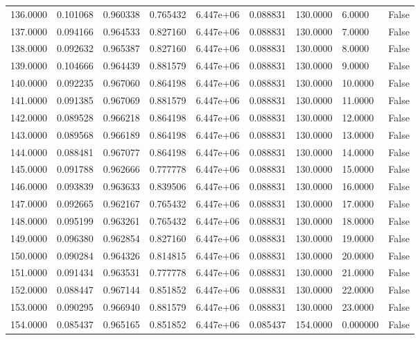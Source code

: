 \documentclass[11pt]{report}
\begin{document}
\begin{longtable}{lllllllll}
136.0000 & 0.101068 & 0.960338 & 0.765432 & 6.447e+06 & 0.088831 & 130.0000 & 6.0000 & False \\
137.0000 & 0.094166 & 0.964533 & 0.827160 & 6.447e+06 & 0.088831 & 130.0000 & 7.0000 & False \\
138.0000 & 0.092632 & 0.965387 & 0.827160 & 6.447e+06 & 0.088831 & 130.0000 & 8.0000 & False \\
139.0000 & 0.104666 & 0.964439 & 0.881579 & 6.447e+06 & 0.088831 & 130.0000 & 9.0000 & False \\
140.0000 & 0.092235 & 0.967060 & 0.864198 & 6.447e+06 & 0.088831 & 130.0000 & 10.0000 & False \\
141.0000 & 0.091385 & 0.967069 & 0.881579 & 6.447e+06 & 0.088831 & 130.0000 & 11.0000 & False \\
142.0000 & 0.089528 & 0.966218 & 0.864198 & 6.447e+06 & 0.088831 & 130.0000 & 12.0000 & False \\
143.0000 & 0.089568 & 0.966189 & 0.864198 & 6.447e+06 & 0.088831 & 130.0000 & 13.0000 & False \\
144.0000 & 0.088481 & 0.967077 & 0.864198 & 6.447e+06 & 0.088831 & 130.0000 & 14.0000 & False \\
145.0000 & 0.091788 & 0.962666 & 0.777778 & 6.447e+06 & 0.088831 & 130.0000 & 15.0000 & False \\
146.0000 & 0.093839 & 0.963633 & 0.839506 & 6.447e+06 & 0.088831 & 130.0000 & 16.0000 & False \\
147.0000 & 0.092665 & 0.962167 & 0.765432 & 6.447e+06 & 0.088831 & 130.0000 & 17.0000 & False \\
148.0000 & 0.095199 & 0.963261 & 0.765432 & 6.447e+06 & 0.088831 & 130.0000 & 18.0000 & False \\
149.0000 & 0.096380 & 0.962854 & 0.827160 & 6.447e+06 & 0.088831 & 130.0000 & 19.0000 & False \\
150.0000 & 0.090284 & 0.964326 & 0.814815 & 6.447e+06 & 0.088831 & 130.0000 & 20.0000 & False \\
151.0000 & 0.091434 & 0.963531 & 0.777778 & 6.447e+06 & 0.088831 & 130.0000 & 21.0000 & False \\
152.0000 & 0.088447 & 0.967144 & 0.851852 & 6.447e+06 & 0.088831 & 130.0000 & 22.0000 & False \\
153.0000 & 0.090295 & 0.966940 & 0.881579 & 6.447e+06 & 0.088831 & 130.0000 & 23.0000 & False \\
154.0000 & 0.085437 & 0.965165 & 0.851852 & 6.447e+06 & 0.085437 & 154.0000 & 0.000000 & False \\

\end{longtable}
\end{document}
